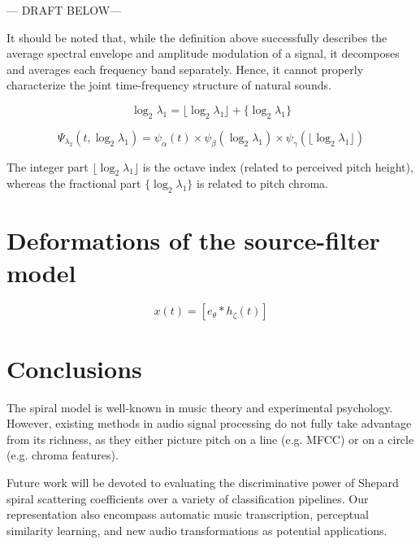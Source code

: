 \documentclass[twoside,a4paper]{article}
\begin{document}
--- DRAFT BELOW---


It should be noted that, while the definition above successfully describes the average spectral envelope and amplitude modulation of a signal, it decomposes and averages each frequency band separately. Hence, it cannot properly characterize the joint time-frequency structure of natural sounds.

\[
\log_2 \lambda_1 = \lfloor \log_2 \lambda_1 \rfloor + \{ \log_2 \lambda_1 \}
\]

\[
\Psi_{\lambda_2}(t, \log_2 \lambda_1) =
\psi_{\alpha}(t) \times
\psi_{\beta}(\log_2 \lambda_1) \times
\psi_{\gamma}(\lfloor \log_2 \lambda_1 \rfloor)
\]

The integer part $\lfloor \log_2 \lambda_1 \rfloor$ is the octave index (related to perceived pitch height), whereas the fractional part $\{ \log_2 \lambda_1 \}$ is related to pitch chroma.

\section{Deformations of the source-filter model}

\[
x(t) = \left[ e_{\theta}\ast h_{\zeta} (t) \right]
\]


\section{Conclusions}

The spiral model is well-known in music theory and experimental psychology. However, existing methods in audio signal processing do not fully take advantage from its richness, as they either picture pitch on a line (e.g. MFCC) or on a circle (e.g. chroma features).

Future work will be devoted to evaluating the discriminative power of Shepard spiral scattering coefficients over a variety of classification pipelines. Our representation also encompass automatic music transcription, perceptual similarity learning, and new audio transformations as potential applications.

\nocite{*}

 
\end{document}
